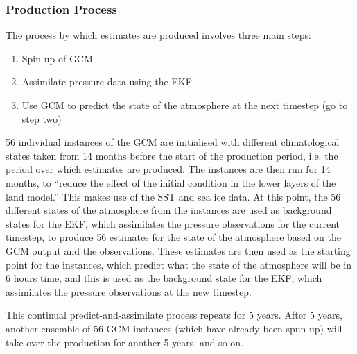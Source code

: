\documentclass[pdftex,12pt,a4paper]{report}
\newcommand{\ts}{\textsuperscript}
\begin{document}


\subsubsection{Production Process}
The process by which estimates are produced involves three main steps:

\begin{enumerate}
    \item Spin up of GCM
    \item Assimilate pressure data using the EKF
    \item Use GCM to predict the state of the atmosphere at the next timestep (go to step two)
\end{enumerate}

56 individual instances of the GCM are initialised with different climatological states taken from
14 months before the start of the production period, i.e. the period over which estimates are
produced. The instances are then run for 14 months, to ``reduce the effect of the initial condition
in the lower layers of the land model.'' This makes use of the SST and sea ice data. At this point,
the 56 different states of the atmosphere from the instances are used as background states for the
EKF, which assimilates the pressure observations for the current timestep, to produce 56 estimates
for the state of the atmosphere based on the GCM output and the observations. These estimates are
then used as the starting point for the instances, which predict what the state of the atmosphere
will be in 6 hours time, and this is used as the background state for the EKF, which assimilates the
pressure observations at the new timestep.

This continual predict-and-assimilate process repeats for 5 years. After 5 years, another ensemble
of 56 GCM instances (which have already been spun up) will take over the production for another 5
years, and so on. 

\end{document}
